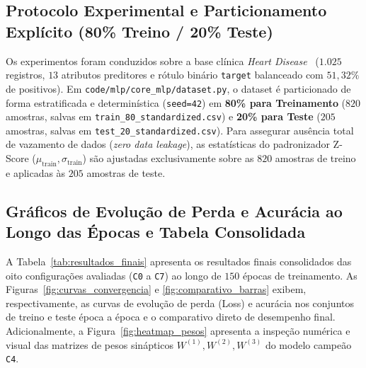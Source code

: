 ﻿\documentclass[runningheads]{llncs}
\begin{document}
\subsection{Protocolo Experimental e Particionamento Expl\'{i}cito (80\% Treino / 20\% Teste)}
Os experimentos foram conduzidos sobre a base cl\'{i}nica \textit{Heart Disease}~\cite{detrano1989international} ($1.025$ registros, $13$ atributos preditores e r\'{o}tulo bin\'{a}rio \texttt{target} balanceado com $51{,}32\%$ de positivos). Em \texttt{code/mlp/core\_mlp/dataset.py}, o dataset \'{e} particionado de forma estratificada e determin\'{i}stica (\texttt{seed=42}) em \textbf{80\% para Treinamento} ($820$ amostras, salvas em \texttt{train\_80\_standardized.csv}) e \textbf{20\% para Teste} ($205$ amostras, salvas em \texttt{test\_20\_standardized.csv}). Para assegurar aus\^{e}ncia total de vazamento de dados (\textit{zero data leakage}), as estat\'{i}sticas do padronizador Z-Score ($\mu_{\text{train}}, \sigma_{\text{train}}$) s\~{a}o ajustadas exclusivamente sobre as $820$ amostras de treino e aplicadas \`{a}s $205$ amostras de teste.

\subsection{Gr\'{a}ficos de Evolu\c{c}\~{a}o de Perda e Acur\'{a}cia ao Longo das \'{E}pocas e Tabela Consolidada}
A Tabela~\ref{tab:resultados_finais} apresenta os resultados finais consolidados das oito configura\c{c}\~{o}es avaliadas (\texttt{C0} a \texttt{C7}) ao longo de $150$ \'{e}pocas de treinamento. As Figuras~\ref{fig:curvas_convergencia} e \ref{fig:comparativo_barras} exibem, respectivamente, as curvas de evolu\c{c}\~{a}o de perda (Loss) e acur\'{a}cia nos conjuntos de treino e teste \'{e}poca a \'{e}poca e o comparativo direto de desempenho final. Adicionalmente, a Figura~\ref{fig:heatmap_pesos} apresenta a inspe\c{c}\~{a}o num\'{e}rica e visual das matrizes de pesos sin\'{a}pticos $W^{(1)}, W^{(2)}, W^{(3)}$ do modelo campe\~{a}o \texttt{C4}.
\end{document}
